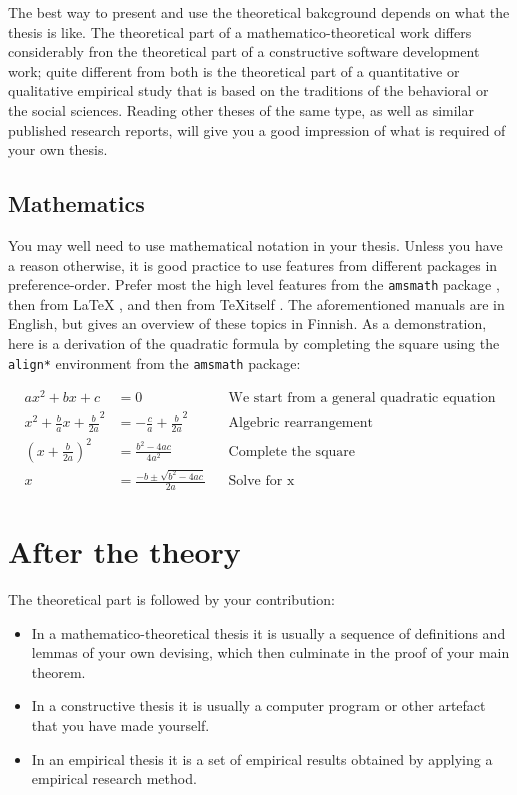 \documentclass[utf8,english]{gradu3}
\begin{document}
The best way to present and use the theoretical bakcground depends on
what the thesis is like.  The theoretical part of a
mathematico-theoretical work differs considerably fron the theoretical
part of a constructive software development work; quite different from
both is the theoretical part of a quantitative or qualitative
empirical study that is based on the traditions of the behavioral or
the social sciences.  Reading other theses of the same type, as well
as similar published research reports, will give you a good impression
of what is required of your own thesis.

\subsection{Mathematics}

You may well need to use mathematical notation in your thesis. Unless you have
a reason otherwise, it is good practice to use features from different packages
in preference-order. Prefer most the high level features from the
\texttt{amsmath} package \parencite[see][]{amsmath-manual}, then from \LaTeX
\parencite[see][]{lamport94:_latex}, and then from \TeX itself
\parencite[see][]{knuth86:_texbook}. The aforementioned manuals are in English,
but  gives an overview of these topics
in Finnish. As a demonstration, here is a derivation of the quadratic formula
by completing the square using the \texttt{align*} environment from the
\texttt{amsmath} package:

\begin{align*}
  ax^2 + bx + c &= 0 && \text{We start from a general quadratic equation} \\
  x^2 + \frac{b}{a}x + \frac{b}{2a}^2 &= -\frac{c}{a} + \frac{b}{2a}^2 && \text{Algebric rearrangement} \\
  \left(x + \frac{b}{2a}\right)^2 &= \frac{b^2 - 4ac}{4a^2} && \text{Complete the square} \\
  x &= \frac{-b \pm \sqrt{b^2 - 4ac}}{2a} && \text{Solve for x}
\end{align*}

\section{After the theory}

The theoretical part is followed by your contribution:
\begin{itemize}
\item In a mathematico-theoretical thesis it is usually a sequence of
  definitions and lemmas of your own devising, which then culminate in
  the proof of your main theorem.
\item In a constructive thesis it is usually a computer program or
  other artefact that you have made yourself.
\item In an empirical thesis it is a set of empirical results obtained
  by applying a empirical research method.
\end{itemize}
\end{document}
